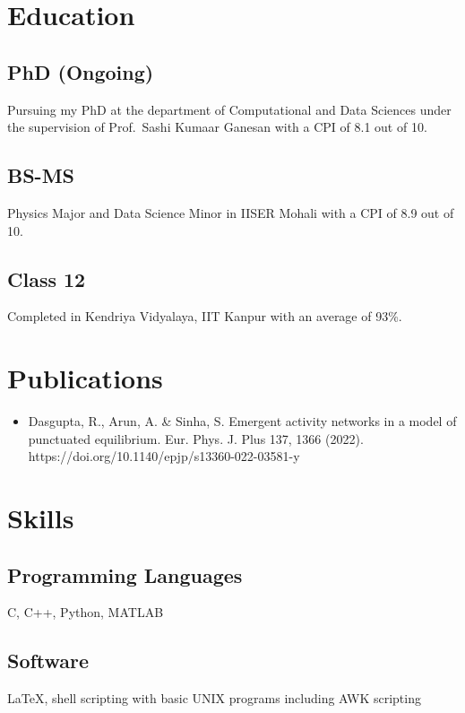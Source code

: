 \documentclass{article}
\begin{document}
\section{Education}

\subsection{PhD (Ongoing)}
Pursuing my PhD at the
department of Computational and Data Sciences
under the supervision of Prof.~Sashi Kumaar Ganesan
with a CPI of 8.1 out of 10.

\subsection{BS-MS}
Physics Major and Data Science Minor
in IISER Mohali with a CPI of 8.9 out of 10.

\subsection{Class 12} 
Completed in Kendriya Vidyalaya, IIT Kanpur
with an average of 93\%.

\section{Publications}

\begin{itemize}
  \item
Dasgupta, R., Arun, A. \& Sinha, S. Emergent activity networks in a model of punctuated equilibrium. Eur. Phys. J. Plus 137, 1366 (2022). https://doi.org/10.1140/epjp/s13360-022-03581-y
\end{itemize}

\section{Skills}

\subsection{Programming Languages}
C, C++, Python, MATLAB

\subsection{Software}
\LaTeX,
shell scripting with basic UNIX programs
including AWK scripting

\end{document}
